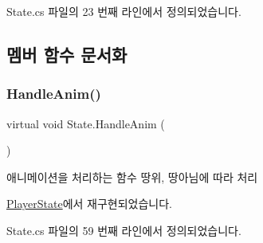 State.\+cs 파일의 23 번째 라인에서 정의되었습니다.


\begin{DoxyCode}{0}

\end{DoxyCode}


\subsection{멤버 함수 문서화}
\mbox{\label{class_state_aa064ec6cd84d4a09b2c72a536125c74b}} 
\subsubsection{\texorpdfstring{HandleAnim()}{HandleAnim()}}
{\footnotesize\ttfamily virtual void State.\+Handle\+Anim (\begin{DoxyParamCaption}{ }\end{DoxyParamCaption})\hspace{0.3cm}{\ttfamily [virtual]}}



애니메이션을 처리하는 함수\textquotesingle{} 땅위, 땅아님에 따라 처리 



\mbox{\hyperlink{class_player_state_ae57c0c11c946d701bb1e0eb2bc7204dd}{Player\+State}}에서 재구현되었습니다.



State.\+cs 파일의 59 번째 라인에서 정의되었습니다.


